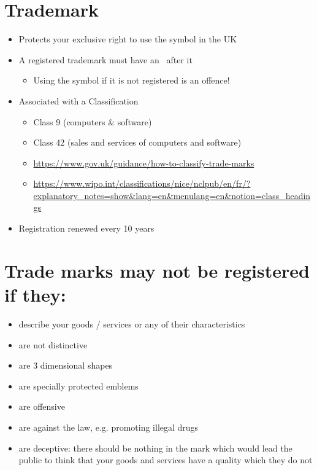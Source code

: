 \documentclass{article}
\begin{document}
\section{Trademark}
\begin{itemize}
\item Protects your exclusive right to use the symbol in the UK
\item A registered trademark must have an \textregistered\ after it 
\begin{itemize}
\item Using the symbol if it is not registered is an offence!
\end{itemize}
\item Associated with a Classification
\begin{itemize}
\item Class 9 (computers \& software)
\item Class 42 (sales and services of computers and software)
\item \url{https://www.gov.uk/guidance/how-to-classify-trade-marks}
\item \url{https://www.wipo.int/classifications/nice/nclpub/en/fr/?explanatory_notes=show&lang=en&menulang=en&notion=class_headings}
\end{itemize}
\item Registration renewed every 10 years
\end{itemize}



\section{Trade marks may not be registered if they:}
\begin{itemize}
\item describe your goods / services or any of their characteristics
\item are not distinctive
\item are 3 dimensional shapes
\item are specially protected emblems
\item are offensive
\item are against the law, e.g. promoting illegal drugs
\item are deceptive: there should be nothing in the mark which would lead the public to think that your goods and services have a quality which they do not
\end{itemize}
\end{document}
